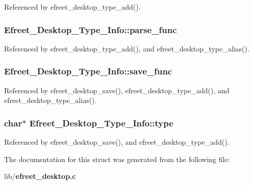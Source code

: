 Referenced by efreet\_\-desktop\_\-type\_\-add().
\subsubsection[parse\_\-func]{ {\bf Efreet\_\-Desktop\_\-Type\_\-Info::parse\_\-func}}\label{structEfreet__Desktop__Type__Info_62e3cdf35b73ff0300a53fec1279bee3}




Referenced by efreet\_\-desktop\_\-type\_\-add(), and efreet\_\-desktop\_\-type\_\-alias().
\subsubsection[save\_\-func]{ {\bf Efreet\_\-Desktop\_\-Type\_\-Info::save\_\-func}}\label{structEfreet__Desktop__Type__Info_9d27f050bca046b65433c43c94d04c0b}




Referenced by efreet\_\-desktop\_\-save(), efreet\_\-desktop\_\-type\_\-add(), and efreet\_\-desktop\_\-type\_\-alias().
\subsubsection[type]{\setlength{\rightskip}{0pt plus 5cm}char$\ast$ {\bf Efreet\_\-Desktop\_\-Type\_\-Info::type}}\label{structEfreet__Desktop__Type__Info_7828dc765e6e1b8a7be3fc0b9d6b59f2}




Referenced by efreet\_\-desktop\_\-save(), and efreet\_\-desktop\_\-type\_\-add().

The documentation for this struct was generated from the following file:\begin{CompactItemize}
\item 
lib/{\bf efreet\_\-desktop.c}\end{CompactItemize}
